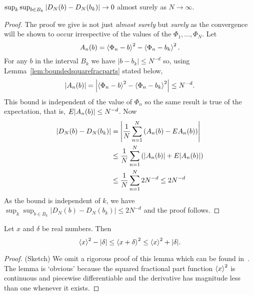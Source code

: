 \documentclass[journal]{IEEEtran}
\begin{document}
\begin{lemma}\label{lem:DNoverBij->0}
$\sup_{k }\sup_{b \in B_k}{\left| D_N(b) - D_N(b_k) \right|} \rightarrow 0$ almost surely as $N\rightarrow \infty$.
 \end{lemma}
\begin{proof}
The proof we give is not just \emph{almost surely} but \emph{surely} as the convergence will be shown to occur irrespective of the values of the $\Phi_1, \dots, \Phi_N$.  Let 
\[ 
A_n(b) = \left< \Phi_n - b \right>^2 - \left< \Phi_n - b_k \right>^2.
\]
For any $b$ in the interval $B_k$ we have $|b - b_k| \leq N^{-d}$ so, using Lemma~\ref{lem:boundedsquarefracparts} stated below,
\[
{\left| A_n(b) \right|} =  {\left| \left< \Phi_n - b \right>^2 - \left< \Phi_n - b_k \right>^2 \right|} \leq N^{-d}.
\]
This bound is independent of the value of $\Phi_n$ so the same result is true of the expectation, that is, $E{\left| A_n(b) \right|} \leq N^{-d}$.  Now
\begin{align*}
{\left| D_N(b) - D_N(b_k) \right|} &= {\left|  \frac{1}{N}\sum_{n=1}^{N} \left( A_n(b) - EA_n(b) \right)  \right|} \\
&\leq \frac{1}{N}\sum_{n=1}^{N} \left( {\left|  A_n(b)  \right|} + E{\left| A_n(b) \right|} \right)  \\ 
&\leq \frac{1}{N}\sum_{n=1}^{N} 2N^{-d} \leq 2N^{-d}
\end{align*}
As the bound is independent of $k$, we have $\sup_{k}\sup_{ b  \in B_k }\left\vert D_N(b) - D_N(b_k)\right\vert \leq 2N^{-d}$ and the proof follows.
\end{proof}

\begin{lemma}\label{lem:boundedsquarefracparts}
Let $x$ and $\delta$ be real numbers.  Then
\[
\left< x \right>^2 - |\delta| \leq \left< x + \delta \right>^2 \leq \left< x \right>^2 + |\delta|.
\]
\end{lemma}
\begin{proof} (Sketch)
We omit a rigorous proof of this lemma which can be found in~\cite[Lemma~8.4]{McKilliam2010thesis}. The lemma is `obvious' because the squared fractional part function $\left< x \right>^2$ is continuous and piecewise differentiable and the derivative has magnitude less than one whenever it exists.
\end{proof}
\end{document}
